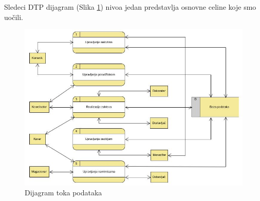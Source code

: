 Sledeci DTP dijagram (Slika \ref{fig:slika2}) nivoa jedan predstavlja osnovne celine koje smo uočili. 
\begin{figure}[ht]
    \leavevmode
    \begin{center}
    \includegraphics[height=0.55\textheight]{slike/DTP.jpg}
    \end{center}
    \caption{Dijagram toka podataka} %
    \label{fig:slika2}
\end{figure}
